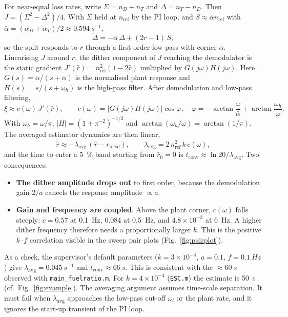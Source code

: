 \documentclass[11pt,a4paper]{article}
\newcommand{\nD}{n_D}
\newcommand{\nT}{n_T}
\newcommand{\nref}{n_\mathrm{ref}}
\newcommand{\rid}{r_\mathrm{ideal}}
\newcommand{\rhat}{\hat r}
\newcommand{\lavg}{\lambda_\mathrm{avg}}
\begin{document}
For near-equal loss rates, write $\Sigma=\nD+\nT$ and $\Delta=\nT-\nD$. Then $J=(\Sigma^2-\Delta^2)/4$. With $\Sigma$ held at $\nref$ by the PI loop, and $S\approx\bar\alpha\nref$ with $\bar\alpha=(\alpha_D+\alpha_T)/2\approx\SI{0.594}{s^{-1}}$,
\begin{equation}
  \dot\Delta = -\bar\alpha\,\Delta + (2r-1)\,S ,
\end{equation}
so the split responds to $r$ through a first-order low-pass with corner $\bar\alpha$. Linearising $J$ around $\rhat$, the dither component of $J$ reaching the demodulator is the static gradient $J'(\rhat)=\nref^2(1-2\rhat)$ multiplied by $G(j\omega)H(j\omega)$. Here $G(s)=\bar\alpha/(s+\bar\alpha)$ is the normalised plant response and $H(s)=s/(s+\omega_h)$ is the high-pass filter. After demodulation and low-pass filtering,
\begin{equation}
  \xi \approx c(\omega)\,J'(\rhat),\qquad
  c(\omega)=|G(j\omega)H(j\omega)|\cos\varphi,\quad
  \varphi = -\arctan\frac{\omega}{\bar\alpha}+\arctan\frac{\omega_h}{\omega}.
  \label{eq:c}
\end{equation}
With $\omega_h=\omega/\pi$, $|H|=(1+\pi^{-2})^{-1/2}$ and $\arctan(\omega_h/\omega)=\arctan(1/\pi)$. The averaged estimator dynamics are then linear,
\begin{equation}
  \dot{\rhat} \approx -\lavg\,(\rhat-\rid),\qquad \boxed{\lavg = 2\,\nref^2\,k\,c(\omega)} ,
  \label{eq:lavg}
\end{equation}
and the time to enter a \SI{5}{\percent} band starting from $\rhat_0=0$ is $t_\mathrm{conv}\approx\ln 20/\lavg$.
Two consequences:
\begin{itemize}
  \item \textbf{The dither amplitude drops out} to first order, because the demodulation gain $2/a$ cancels the response amplitude $\propto a$.
  \item \textbf{Gain and frequency are coupled}. Above the plant corner, $c(\omega)$ falls steeply: $c=0.57$ at \SI{0.1}{Hz}, $0.084$ at \SI{0.5}{Hz}, and $4.8\times10^{-3}$ at \SI{6}{Hz}. A higher dither frequency therefore needs a proportionally larger $k$. This is the positive $k$--$f$ correlation visible in the sweep pair plots (Fig.~\ref{fig:pairplot}).
\end{itemize}
As a check, the supervisor's default parameters ($k=3\times10^{-4}$, $a=0.1$, $f=\SI{0.1}{Hz}$) give $\lavg=\SI{0.045}{s^{-1}}$ and $t_\mathrm{conv}\approx\SI{66}{s}$. This is consistent with the $\approx\SI{60}{s}$ observed with \texttt{main\_fuelratio.m}. For $k=4\times10^{-4}$ (\texttt{ESC.m}) the estimate is \SI{50}{s} (cf.\ Fig.~\ref{fig:example}).
The averaging argument assumes time-scale separation. It must fail when $\lavg$ approaches the low-pass cut-off $\omega_l$ or the plant rate, and it ignores the start-up transient of the PI loop.
\end{document}
